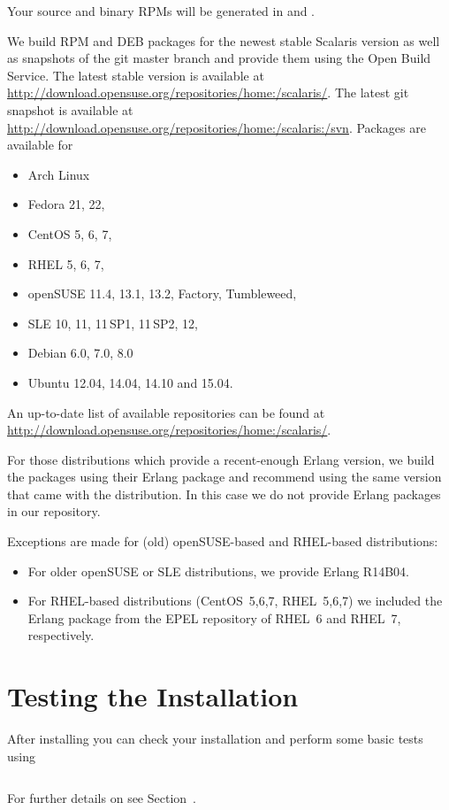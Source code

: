 Your source and binary RPMs will be generated in
 and .

We build RPM and DEB packages for the newest stable Scalaris version as well as
snapshots of the git master branch and provide them using the Open Build Service.
The latest stable version is available at
\url{http://download.opensuse.org/repositories/home:/scalaris/}.
The latest git snapshot is available at
\url{http://download.opensuse.org/repositories/home:/scalaris:/svn}. Packages
are available for

\begin{itemize}
\item Arch Linux
\item Fedora 21, 22,
\item CentOS 5, 6, 7,
\item RHEL 5, 6, 7,
\item openSUSE 11.4, 13.1, 13.2, Factory, Tumbleweed,
\item SLE 10, 11, 11\,SP1, 11\,SP2, 12,
\item Debian 6.0, 7.0, 8.0
\item Ubuntu 12.04, 14.04, 14.10 and 15.04.
\end{itemize}

An up-to-date list of available repositories can be found at
\url{http://download.opensuse.org/repositories/home:/scalaris/}.

For those distributions which provide a recent-enough Erlang version, we build
the packages using their Erlang package and recommend using the same version
that came with the distribution. In this case we do not provide Erlang packages
in our repository.

Exceptions are made for (old) openSUSE-based and RHEL-based distributions:
\begin{itemize}
  \item For older openSUSE or SLE distributions, we provide Erlang R14B04.
  \item For RHEL-based distributions (CentOS~5,6,7, RHEL~5,6,7) we included the Erlang
package from the EPEL repository of RHEL~6 and RHEL~7, respectively.
\end{itemize}

\section{Testing the Installation}

After installing \scalaris{} you can check your installation and perform
some basic tests using

\begin{lstlisting}[language=sh]
%> scalarisctl checkinstallation
\end{lstlisting}

For further details on  see
Section~.
